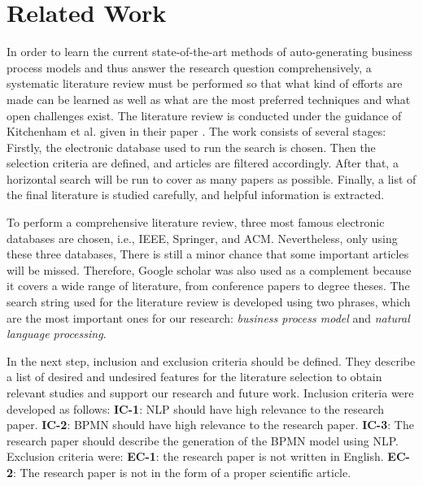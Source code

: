 \chapter{Related Work}

	In order to learn the current state-of-the-art methods of auto-generating business process models and thus answer the research question comprehensively, a systematic literature review must be performed so that what kind of efforts are made can be learned as well as what are the most preferred techniques and what open challenges exist. The literature review is conducted under the guidance of Kitchenham et al. given in their paper \cite{literature_review_guidance}. The work consists of several stages: Firstly, the electronic database used to run the search is chosen. Then the selection criteria are defined, and articles are filtered accordingly. After that, a horizontal search will be run to cover as many papers as possible. Finally, a list of the final literature is studied carefully, and helpful information is extracted.
	
	To perform a comprehensive literature review, three most famous electronic databases are chosen, i.e., IEEE, Springer, and ACM. Nevertheless, only using these three databases, There is still a minor chance that some important articles will be missed. Therefore, Google scholar was also used as a complement because it covers a wide range of literature, from conference papers to degree theses. The search string used for the literature review is developed using two phrases, which are the most important ones for our research: \textit{business process model} and \textit{natural language processing}.
	
	In the next step, inclusion and exclusion criteria should be defined. They describe a list of desired and undesired features for the literature selection to obtain relevant studies and support our research and future work. Inclusion criteria were developed as follows: \textbf{IC-1}: NLP should have high relevance to the research paper. \textbf{IC-2}: BPMN should have high relevance to the research paper. \textbf{IC-3}: The research paper should describe the generation of the BPMN model using NLP. Exclusion criteria were: \textbf {EC-1}: the research paper is not written in English. \textbf{EC-2}: The research paper is not in the form of a proper scientific article. 
	
